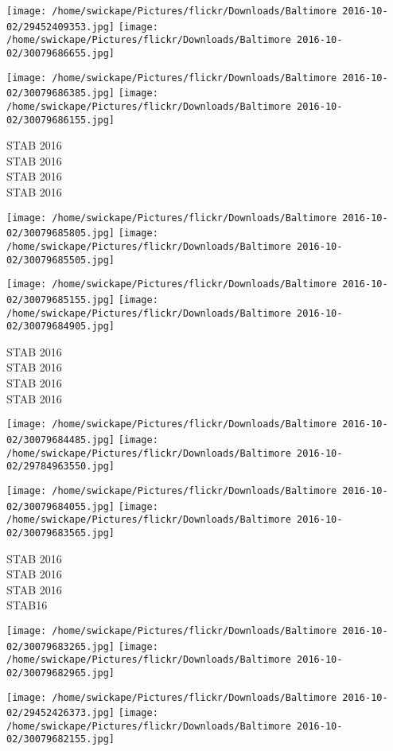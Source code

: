 \documentclass[10pt,letterpaper]{article}
\begin{document}
\texttt{[image: /home/swickape/Pictures/flickr/Downloads/Baltimore 2016-10-02/29452409353.jpg]}
\texttt{[image: /home/swickape/Pictures/flickr/Downloads/Baltimore 2016-10-02/30079686655.jpg]}

\texttt{[image: /home/swickape/Pictures/flickr/Downloads/Baltimore 2016-10-02/30079686385.jpg]}
\texttt{[image: /home/swickape/Pictures/flickr/Downloads/Baltimore 2016-10-02/30079686155.jpg]}

STAB 2016\\
STAB 2016\\
STAB 2016\\
STAB 2016
\pagebreak

\texttt{[image: /home/swickape/Pictures/flickr/Downloads/Baltimore 2016-10-02/30079685805.jpg]}
\texttt{[image: /home/swickape/Pictures/flickr/Downloads/Baltimore 2016-10-02/30079685505.jpg]}

\texttt{[image: /home/swickape/Pictures/flickr/Downloads/Baltimore 2016-10-02/30079685155.jpg]}
\texttt{[image: /home/swickape/Pictures/flickr/Downloads/Baltimore 2016-10-02/30079684905.jpg]}

STAB 2016\\
STAB 2016\\
STAB 2016\\
STAB 2016
\pagebreak

\texttt{[image: /home/swickape/Pictures/flickr/Downloads/Baltimore 2016-10-02/30079684485.jpg]}
\texttt{[image: /home/swickape/Pictures/flickr/Downloads/Baltimore 2016-10-02/29784963550.jpg]}

\texttt{[image: /home/swickape/Pictures/flickr/Downloads/Baltimore 2016-10-02/30079684055.jpg]}
\texttt{[image: /home/swickape/Pictures/flickr/Downloads/Baltimore 2016-10-02/30079683565.jpg]}

STAB 2016\\
STAB 2016\\
STAB 2016\\
STAB16
\pagebreak

\texttt{[image: /home/swickape/Pictures/flickr/Downloads/Baltimore 2016-10-02/30079683265.jpg]}
\texttt{[image: /home/swickape/Pictures/flickr/Downloads/Baltimore 2016-10-02/30079682965.jpg]}

\texttt{[image: /home/swickape/Pictures/flickr/Downloads/Baltimore 2016-10-02/29452426373.jpg]}
\texttt{[image: /home/swickape/Pictures/flickr/Downloads/Baltimore 2016-10-02/30079682155.jpg]}
\end{document}
